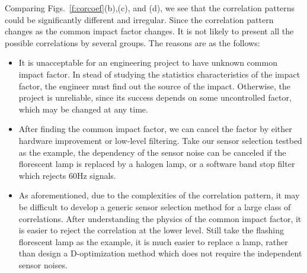 Comparing Figs.~\ref{f:corcoef}(b),(c), and (d), we see that the correlation patterns could be significantly different and irregular. Since the correlation pattern changes as the common impact factor changes.
It is not likely to present all the possible correlations by several groups.
The reasons are as the follows:



\begin{itemize}
  \item It is unacceptable for an engineering project to have unknown common impact factor. In stead of studying the statistics characteristics of the impact factor, the engineer must find out the source of the impact. Otherwise, the project is unreliable, since its success depends on some uncontrolled factor, which may be changed at any time.
  \item   After finding the common impact factor, we can cancel the factor by either hardware improvement or low-level filtering.
  Take our sensor selection testbed as the example, the dependency of the sensor noise can be canceled if the florescent lamp is replaced by a halogen lamp, or a software band stop filter which rejects 60Hz signals.
  \item As aforementioned, due to the complexities of the correlation pattern, it may be  difficult to develop a generic sensor selection method for a large class of correlations. After understanding the physics of the common impact factor, it is easier to reject the correlation at the lower level. Still take the flashing florescent lamp as the example, it is much easier to replace a lamp, rather than design a D-optimization method which does not require the independent sensor noises.
\end{itemize}


